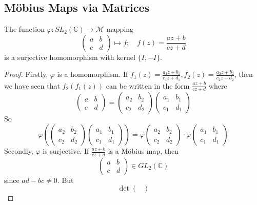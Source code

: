 \subsection{M\"obius Maps via Matrices}
\begin{proposition}
	The function \(\varphi\colon SL_2(\mathbb C) \to \mathcal M\) mapping
	\[
		\begin{pmatrix}
			a & b \\ c & d
		\end{pmatrix} \mapsto f;\quad f(z) = \frac{az + b}{cz + d}
	\]
	is a surjective homomorphism with kernel \(\{ I, -I \}\).
\end{proposition}
\begin{proof}
	Firstly, \(\varphi\) is a homomorphism.
	If \(f_1(z) = \frac{a_1z+b_1}{c_1z+d_1}, f_2(z) = \frac{a_2z+b_2}{c_2z+d_2}\), then we have seen that \(f_2(f_1(z))\) can be written in the form \(\frac{az+b}{cz+d}\) where
	\[
		\begin{pmatrix}
			a & b \\ c & d
		\end{pmatrix} = \begin{pmatrix}
			a_2 & b_2 \\ c_2 & d_2
		\end{pmatrix}\begin{pmatrix}
			a_1 & b_1 \\ c_1 & d_1
		\end{pmatrix}
	\]
	So
	\[
		\varphi\left( \begin{pmatrix}
				a_2 & b_2 \\ c_2 & d_2
			\end{pmatrix}\begin{pmatrix}
				a_1 & b_1 \\ c_1 & d_1
			\end{pmatrix} \right) = \varphi \begin{pmatrix}
			a_2 & b_2 \\ c_2 & d_2
		\end{pmatrix} \cdot \varphi \begin{pmatrix}
			a_1 & b_1 \\ c_1 & d_1
		\end{pmatrix}
	\]
	Secondly, \(\varphi\) is surjective.
	If \(\frac{az+b}{cz+d}\) is a M\"obius map, then
	\[
		\begin{pmatrix}
			a & b \\ c & d
		\end{pmatrix} \in GL_2(\mathbb C)
	\]
	since \(ad-bc\neq 0\).
	But
	\[
		\det \begin{pmatrix}

\end{pmatrix}\]
\end{proof}
